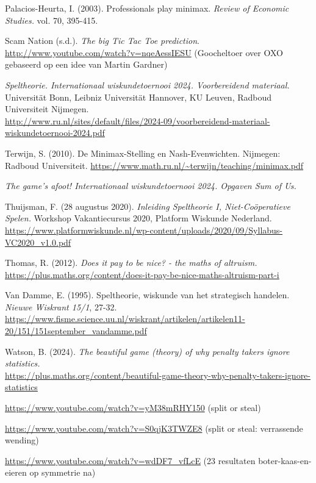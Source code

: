 \begin{bronnen}
    \item Palacios-Heurta, I. (2003). Professionals play minimax. \emph{Review of Economic Studies.} vol. 70, 395-415.
    
    \item Scam Nation (s.d.). \emph{The big Tic Tac Toe prediction}. \url{http://www.youtube.com/watch?v=nqeAessIESU} (Goocheltoer over OXO gebaseerd op een idee van Martin Gardner)

    \item \emph{Speltheorie. Internationaal wiskundetoernooi 2024. Voorbereidend materiaal.} Universität Bonn, Leibniz Universität Hannover, KU Leuven, Radboud Universiteit Nijmegen. \\
    \url{http://www.ru.nl/sites/default/files/2024-09/voorbereidend-materiaal-wiskundetoernooi-2024.pdf}

    \item Terwijn, S. (2010). De Minimax-Stelling en Nash-Evenwichten. Nijmegen: Radboud Universiteit. \url{https://www.math.ru.nl/~terwijn/teaching/minimax.pdf}

    \item \emph{The game's afoot! Internationaal wiskundetoernooi 2024. Opgaven Sum of Us.}

    \item Thuijsman, F. (28 augustus 2020). \emph{Inleiding Speltheorie I, Niet-Coöperatieve Spelen.} Workshop Vakantiecursus 2020, Platform Wiskunde Nederland. \\ \url{https://www.platformwiskunde.nl/wp-content/uploads/2020/09/Syllabus-VC2020_v1.0.pdf}
    
    \item Thomas, R. (2012). \emph{Does it pay to be nice? - the maths of altruism.} \\
    \url{https://plus.maths.org/content/does-it-pay-be-nice-maths-altruism-part-i}

    \item Van Damme, E. (1995). Speltheorie, wiskunde van het strategisch handelen. \emph{Nieuwe Wiskrant 15/1}, 27-32.\\
    \url{https://www.fisme.science.uu.nl/wiskrant/artikelen/artikelen11-20/151/151september_vandamme.pdf}

	\item Watson, B. (2024). \emph{The beautiful game (theory) of why penalty takers ignore statistics.}\\
    \url{https://plus.maths.org/content/beautiful-game-theory-why-penalty-takers-ignore-statistics}
   
     \item \url{https://www.youtube.com/watch?v=yM38mRHY150} (split or steal)

    \item \url{https://www.youtube.com/watch?v=S0qjK3TWZE8} (split or steal: verrassende wending)
    
    \item \url{https://www.youtube.com/watch?v=wdDF7_vfLcE} (23 resultaten boter-kaas-en-eieren op symmetrie na)    
	
\end{bronnen}
